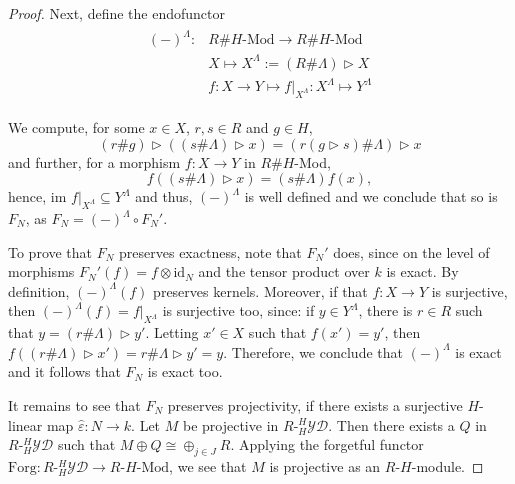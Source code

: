 \documentclass{amsart}
\theoremstyle{definition}
\newcommand{\YD}[1]{\ensuremath{{}^{#1}_{#1}\mathcal{YD}}}
\begin{document}
\begin{proof}
		Next, define the endofunctor
		\begin{align}
		\begin{aligned}
		(-)^\Lambda \colon &R\# H\text{-Mod} \rightarrow R\#H\text{-Mod} \\
		&X \mapsto X^\Lambda :=(R\#\Lambda) \triangleright X \\
		&f:X\rightarrow Y \mapsto f|_{X^\Lambda} \colon X^\Lambda \mapsto Y^\Lambda
		\end{aligned}
		\end{align}
		
		We compute, for some $x\in X$, $r,s\in R$ and $g\in H$,
		$$
		(r\#g)\triangleright ((s\#\Lambda) \triangleright x)
		= (r(g\triangleright s)\# \Lambda)\triangleright x
		$$
		and further, for a morphism $f \colon X \to Y$ in $R\#H$-Mod,
		$$
		f((s\# \Lambda)\triangleright x) = (s\# \Lambda) f(x),
		$$
		hence, $\text{im } f|_{X^\Lambda} \subseteq Y^\Lambda$ and thus, $(-)^\Lambda$ is well defined and we conclude that so is $F_N$, as $F_N= (-)^\Lambda  \circ F_N' $.
		
		To prove that $F_N$ preserves exactness, note that $F_N'$ does, since on the level of  morphisms $F_N'(f)= f\otimes \text{id}_N$ and the tensor product over $k$ is exact.
		By definition, $(-)^\Lambda(f)$ preserves kernels. Moreover, if  that ${f\colon X\rightarrow Y}$  is surjective, then $(-)^\Lambda(f) = f|_{X^\Lambda}$ is surjective too, since: if $y\in Y^\Lambda$, there is $r\in R$ such that $y= (r\#\Lambda) \triangleright y'$. 
		Letting $x'\in X$ such that $f(x') =y'$, then $f((r\# \Lambda) \triangleright x')=
		r\# \Lambda \triangleright y' = y$.	Therefore, we conclude that $(-)^\Lambda$ is exact and it follows that $F_N$ is exact too.
		
		It remains to see that $F_N$ preserves projectivity, if there exists a surjective $H$-linear map $\widehat \varepsilon: N \rightarrow k$.		 		
		Let $M$ be  projective in $R\text{-}\YD H$. Then there exists a $Q$ in $R\text{-}\YD H$ such that ${M \oplus Q \cong \oplus_{j\in J} R}$.
		Applying the forgetful functor $\text{Forg} \colon  {R\text{-}\YD H} \rightarrow R\text{-}H\text{-Mod}$, we see that $M$ is projective as an $R$-$H$-module.
		
		
		

\end{proof}
\end{document}
